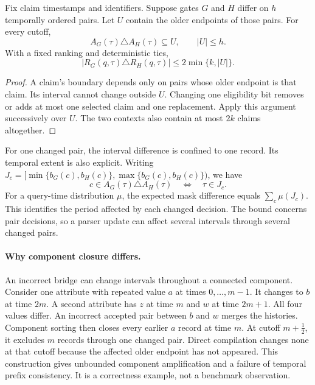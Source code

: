 \begin{theorem}
\label{thm:influence}
Fix claim timestamps and identifiers.
Suppose gates $G$ and $H$ differ on $h$ temporally ordered pairs.
Let $U$ contain the older endpoints of those pairs.
For every cutoff,
\begin{equation}
A_G(\tau)\triangle A_H(\tau)\subseteq U,
\qquad |U|\leq h.
\label{eq:influence}
\end{equation}
With a fixed ranking and deterministic ties,
\begin{equation}
|R_G(q,\tau)\triangle R_H(q,\tau)|
\leq 2\min\{k,|U|\}.
\label{eq:context-bound}
\end{equation}
\end{theorem}
\begin{proof}
A claim's boundary depends only on pairs whose older endpoint is that claim.
Its interval cannot change outside $U$.
Changing one eligibility bit removes or adds at most one selected claim and one replacement.
Apply this argument successively over $U$.
The two contexts also contain at most $2k$ claims altogether.
\end{proof}

For one changed pair, the interval difference is confined to one record.
Its temporal extent is also explicit.
Writing $J_c=[\min\{b_G(c),b_H(c)\},\max\{b_G(c),b_H(c)\})$, we have
\begin{equation}
c\in A_G(\tau)\triangle A_H(\tau)
\quad\Longleftrightarrow\quad\tau\in J_c.
\label{eq:footprint}
\end{equation}
For a query-time distribution $\mu$, the expected mask difference equals $\sum_c\mu(J_c)$.
This identifies the period affected by each changed decision.
The bound concerns pair decisions, so a parser update can affect several intervals through several changed pairs.

\paragraph{Why component closure differs.}
An incorrect bridge can change intervals throughout a connected component.
Consider one attribute with repeated value $a$ at times $0,\ldots,m-1$.
It changes to $b$ at time $2m$.
A second attribute has $z$ at time $m$ and $w$ at time $2m+1$.
All four values differ.
An incorrect accepted pair between $b$ and $w$ merges the histories.
Component sorting then closes every earlier $a$ record at time $m$.
At cutoff $m+\tfrac12$, it excludes $m$ records through one changed pair.
Direct compilation changes none at that cutoff because the affected older endpoint has not appeared.
This construction gives unbounded component amplification and a failure of temporal prefix consistency.
It is a correctness example, not a benchmark observation.

